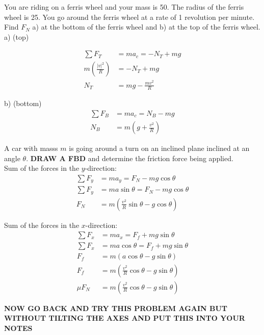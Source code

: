 \begin{problem}
	You are riding on a ferris wheel and your mass is 50\kg. The radius of the ferris wheel is 25\m. You go around the ferris wheel at a rate of 1 revolution per minute. Find $F_N$ a) at the bottom of the ferris wheel and b) at the top of the ferris wheel.\\

	a) (top)

	$$
	\begin{aligned}
		\sum F_{T} &= ma_c = -N_{T} + mg\\
		m\left(\frac{|v|^2}{R}\right) &= -N_{T} + mg\\
		N_{T} &= mg - \frac{mv^2}{R}
	\end{aligned}
	$$

	b) (bottom)
	$$
	\begin{aligned}
		\sum F_{B} &= ma_c = N_B - mg\\
		N_B &= m\left(g + \frac{v^2}{R}\right)
	\end{aligned}
	$$
\end{problem}



\begin{problem}
	A car with masss $m$ is going around a turn on an inclined plane inclined at an angle $\theta$. \textbf{DRAW A FBD} and determine the friction force being applied.\\


	Sum of the forces in the $y$-direction:
	$$
	\begin{aligned}
		\sum F_y &= ma_y = F_N - mg\cos\theta\\
		\sum F_y &= ma\sin\theta = F_N - mg\cos\theta\\
		F_N &= m\left(\frac{v^2}{R}\sin\theta - g\cos\theta\right)
	\end{aligned}
	$$


	Sum of the forces in the $x$-direction:
	$$
	\begin{aligned}
		\sum F_x &= ma_x = F_f + mg\sin\theta\\
		\sum F_x &= ma\cos\theta = F_f + mg\sin\theta\\
		F_f &= m(a\cos\theta - g\sin\theta)\\
		F_f &= m\left(\frac{v^2}{R}\cos\theta - g\sin\theta\right)\\
		\mu F_N &= m\left(\frac{v^2}{R}\cos\theta - g\sin\theta\right)
	\end{aligned}
	$$

	\textbf{NOW GO BACK AND TRY THIS PROBLEM AGAIN BUT WITHOUT TILTING THE AXES AND PUT THIS INTO YOUR NOTES}
\end{problem}


